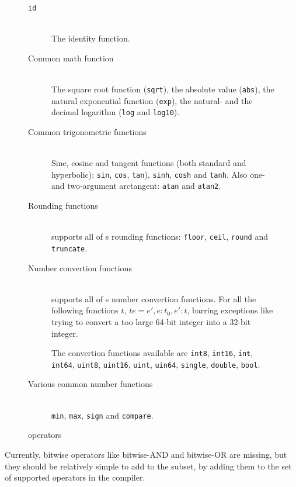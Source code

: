 \begin{figure}[h]
  \centering
\begin{description}
\item[\texttt{id}]\hfill\\
  The identity function.

\item[Common math function]\hfill\\
  The square root function (\texttt{sqrt}), the absolute value (\texttt{abs}),
  the natural exponential function (\texttt{exp}), the natural- and the decimal
  logarithm (\texttt{log} and \texttt{log10}).
  
\item[Common trigonometric functions]\hfill\\
  Sine, cosine and tangent functions (both standard and hyperbolic):
  \texttt{sin}, \texttt{cos}, \texttt{tan}), \texttt{sinh}, \texttt{cosh} and \texttt{tanh}.
  Also one- and two-argument arctangent: \texttt{atan} and \texttt{atan2}.

\item[Rounding functions]\hfill\\
  \fshark{} supports all of \fsharp{}s rounding functions:
  \texttt{floor}, \texttt{ceil}, \texttt{round} and \texttt{truncate}.
  
\item[Number convertion functions]\hfill\\
  \fshark{} supports all of \fsharp{}s number convertion functions.
  For all the following functions $t$, $t e = e', e : t_0, e' : t$, barring
  exceptions like trying to convert a too large 64-bit integer into a 32-bit
  integer.

  The convertion functions available are \texttt{int8}, \texttt{int16}, \texttt{int}, \texttt{int64}, \texttt{uint8}, \texttt{uint16},
  \texttt{uint}, \texttt{uin64}, \texttt{single}, \texttt{double}, \texttt{bool}.
  
\item[Various common number functions]\hfill\\
  \texttt{min}, \texttt{max}, \texttt{sign} and \texttt{compare}.
\end{description}
  \caption{\fshark{} operators}
  \label{fig:fsharkfuns}
\end{figure}

Currently, bitwise operators like bitwise-AND and bitwise-OR are missing, but
they should be relatively simple to add to the \fshark{} subset, by adding them
to the set of supported operators in the \fshark{} compiler.

